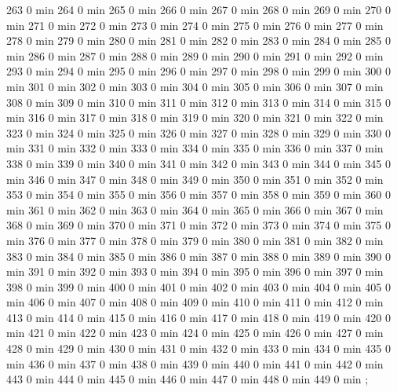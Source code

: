 {263 0 min
264 0 min
265 0 min
266 0 min
267 0 min
268 0 min
269 0 min
270 0 min
271 0 min
272 0 min
273 0 min
274 0 min
275 0 min
276 0 min
277 0 min
278 0 min
279 0 min
280 0 min
281 0 min
282 0 min
283 0 min
284 0 min
285 0 min
286 0 min
287 0 min
288 0 min
289 0 min
290 0 min
291 0 min
292 0 min
293 0 min
294 0 min
295 0 min
296 0 min
297 0 min
298 0 min
299 0 min
300 0 min
301 0 min
302 0 min
303 0 min
304 0 min
305 0 min
306 0 min
307 0 min
308 0 min
309 0 min
310 0 min
311 0 min
312 0 min
313 0 min
314 0 min
315 0 min
316 0 min
317 0 min
318 0 min
319 0 min
320 0 min
321 0 min
322 0 min
323 0 min
324 0 min
325 0 min
326 0 min
327 0 min
328 0 min
329 0 min
330 0 min
331 0 min
332 0 min
333 0 min
334 0 min
335 0 min
336 0 min
337 0 min
338 0 min
339 0 min
340 0 min
341 0 min
342 0 min
343 0 min
344 0 min
345 0 min
346 0 min
347 0 min
348 0 min
349 0 min
350 0 min
351 0 min
352 0 min
353 0 min
354 0 min
355 0 min
356 0 min
357 0 min
358 0 min
359 0 min
360 0 min
361 0 min
362 0 min
363 0 min
364 0 min
365 0 min
366 0 min
367 0 min
368 0 min
369 0 min
370 0 min
371 0 min
372 0 min
373 0 min
374 0 min
375 0 min
376 0 min
377 0 min
378 0 min
379 0 min
380 0 min
381 0 min
382 0 min
383 0 min
384 0 min
385 0 min
386 0 min
387 0 min
388 0 min
389 0 min
390 0 min
391 0 min
392 0 min
393 0 min
394 0 min
395 0 min
396 0 min
397 0 min
398 0 min
399 0 min
400 0 min
401 0 min
402 0 min
403 0 min
404 0 min
405 0 min
406 0 min
407 0 min
408 0 min
409 0 min
410 0 min
411 0 min
412 0 min
413 0 min
414 0 min
415 0 min
416 0 min
417 0 min
418 0 min
419 0 min
420 0 min
421 0 min
422 0 min
423 0 min
424 0 min
425 0 min
426 0 min
427 0 min
428 0 min
429 0 min
430 0 min
431 0 min
432 0 min
433 0 min
434 0 min
435 0 min
436 0 min
437 0 min
438 0 min
439 0 min
440 0 min
441 0 min
442 0 min
443 0 min
444 0 min
445 0 min
446 0 min
447 0 min
448 0 min
449 0 min
};
